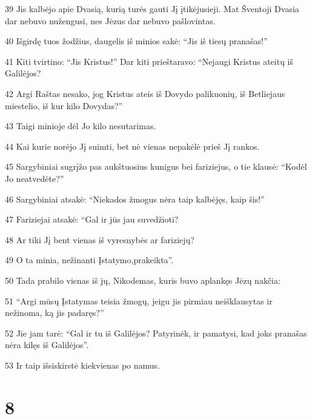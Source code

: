 \par 39 Jis kalbėjo apie Dvasią, kurią turės gauti Jį įtikėjusieji. Mat Šventoji Dvasia dar nebuvo nužengusi, nes Jėzus dar nebuvo pašlovintas. 
\par 40 Išgirdę tuos žodžius, daugelis iš minios sakė: “Jis iš tiesų pranašas!” 
\par 41 Kiti tvirtino: “Jis Kristus!” Dar kiti prieštaravo: “Nejaugi Kristus ateitų iš Galilėjos? 
\par 42 Argi Raštas nesako, jog Kristus ateis iš Dovydo palikuonių, iš Betliejaus miestelio, iš kur kilo Dovydas?” 
\par 43 Taigi minioje dėl Jo kilo nesutarimas. 
\par 44 Kai kurie norėjo Jį suimti, bet nė vienas nepakėlė prieš Jį rankos. 
\par 45 Sargybiniai sugrįžo pas aukštuosius kunigus bei fariziejus, o tie klausė: “Kodėl Jo neatvedėte?” 
\par 46 Sargybiniai atsakė: “Niekados žmogus nėra taip kalbėjęs, kaip šis!” 
\par 47 Fariziejai atsakė: “Gal ir jūs jau suvedžioti? 
\par 48 Ar tiki Jį bent vienas iš vyresnybės ar fariziejų? 
\par 49 O ta minia, nežinanti Įstatymo,­prakeikta”. 
\par 50 Tada prabilo vienas iš jų, Nikodemas, kuris buvo aplankęs Jėzų nakčia: 
\par 51 “Argi mūsų Įstatymas teisia žmogų, jeigu jis pirmiau neišklausytas ir nežinoma, ką jis padaręs?” 
\par 52 Jie jam tarė: “Gal ir tu iš Galilėjos? Patyrinėk, ir pamatysi, kad joks pranašas nėra kilęs iš Galilėjos”. 
\par 53 Ir taip išsiskirstė kiekvienas po namus.


\chapter{8}


